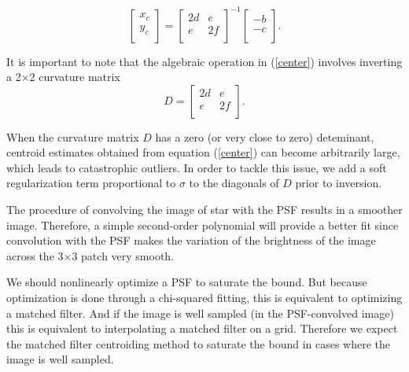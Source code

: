 \documentclass[12pt, preprint]{aastex}
\newcommand{\beq}{\begin{equation}}
\newcommand{\eeq}{\end{equation}}
\begin{document}
\begin{description}
\beq
  \begin{bmatrix}
      x_{c}\\
      y_{c}\\
  \end{bmatrix} = 
  \begin{bmatrix}
      2d & e\\
      e & 2f\\
  \end{bmatrix}^{-1}
  \begin{bmatrix}
      -b\\
      -c\\
  \end{bmatrix}.
\label{center}
\eeq

It is important to note that the algebraic operation in (\ref{center}) involves 
inverting a 2$\times$2 curvature matrix
\beq
  D = 
  \begin{bmatrix}
      2d & e\\
      e & 2f\\
  \end{bmatrix}.
\eeq

When the curvature matrix $D$ has a zero (or very close to zero) deteminant,
centroid estimates obtained from equation (\ref{center}) can become arbitrarily 
large, which leads to catastrophic outliers. 
In order to tackle this issue, we add a soft regularization term
proportional to $\sigma$ to the diagonals of $D$ prior to inversion.

The procedure of convolving the image of star with the PSF results in a
smoother image. Therefore, a simple second-order polynomial will provide a better fit 
since convolution with the PSF makes the variation of the brightness of the image 
across the 3$\times$3 patch very smooth.

We should nonlinearly optimize a PSF to saturate the bound.
But because optimization is done through a chi-squared fitting, 
this is equivalent to optimizing a matched filter. 
And if the image is well sampled (in the PSF-convolved image) this
is equivalent to interpolating a matched filter on a grid. 
Therefore we expect the matched filter centroiding method to 
saturate the bound in cases where the image is well sampled.
 

\end{description}
\end{document}
